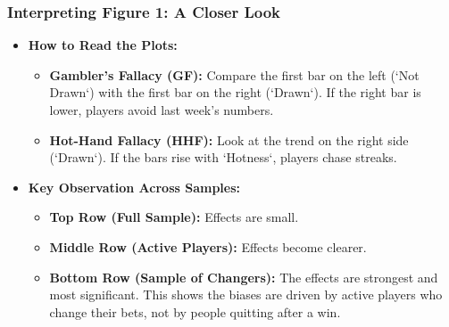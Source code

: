 \documentclass{beamer}
\begin{document}
\begin{frame}
    \frametitle{Interpreting Figure 1: A Closer Look}
    \begin{itemize}
        \item \textbf{How to Read the Plots:}
        \begin{itemize}
            \item \textbf{Gambler's Fallacy (GF):} Compare the first bar on the left (`Not Drawn`) with the first bar on the right (`Drawn`). If the right bar is lower, players avoid last week's numbers.
            \item \textbf{Hot-Hand Fallacy (HHF):} Look at the trend on the right side (`Drawn`). If the bars rise with `Hotness`, players chase streaks.
        \end{itemize}
        \vspace{1em}
        \item \textbf{Key Observation Across Samples:}
        \begin{itemize}
            \item \textbf{Top Row (Full Sample):} Effects are small.
            \item \textbf{Middle Row (Active Players):} Effects become clearer.
            \item \textbf{Bottom Row (Sample of Changers):} The effects are strongest and most significant. This shows the biases are driven by active players who change their bets, not by people quitting after a win.
        \end{itemize}
    \end{itemize}
\end{frame}
\end{document}
